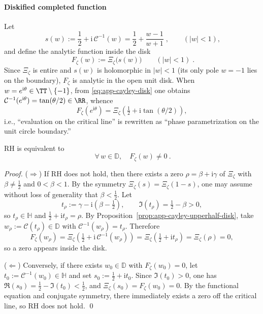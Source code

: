 \paragraph{Diskified completed function}
Let
\begin{equation}\label{eq:app-s-of-w}
\boxed{\;
s(w):=\frac12+\mathrm{i}\,\mathcal{C}^{-1}(w)
=\frac12+\frac{w-1}{w+1}\; },
\qquad (|w|<1),
\end{equation}
and define the analytic function inside the disk
\begin{equation}\label{eq:app-Fzeta-disk}
\boxed{\;
F_{\zeta}(w):=\Xi_{\zeta}\!\bigl(s(w)\bigr)\qquad(|w|<1)\; }.
\end{equation}
Since \(\Xi_{\zeta}\) is entire and \(s(w)\) is holomorphic in \(|w|<1\) (its only pole \(w=-1\) lies on the boundary), \(F_{\zeta}\) is analytic in the open unit disk.
When \(w=e^{\mathrm{i}\theta}\in\TT\setminus\{-1\}\), from \eqref{eq:app-cayley-disk} one obtains \(\mathcal{C}^{-1}(e^{\mathrm{i}\theta})=\tan(\theta/2)\in\RR\), whence
\begin{equation}\label{eq:app-Fzeta-boundary}
F_{\zeta}(e^{\mathrm{i}\theta})=\Xi_{\zeta}\!\left(\tfrac12+\mathrm{i}\tan(\theta/2)\right),
\end{equation}
i.e., ``evaluation on the critical line'' is rewritten as ``phase parametrization on the unit circle boundary.''

\begin{theorem}\label{thm:app-rh-iff-disk-zero-free}
RH is equivalent to
\[
\boxed{\ \forall\,w\in\mathbb{D},\quad F_{\zeta}(w)\neq 0\ }.
\]
\end{theorem}
\begin{proof}
(\(\Rightarrow\)) If RH does not hold, then there exists a zero \(\rho=\beta+\mathrm{i}\gamma\) of \(\Xi_{\zeta}\) with \(\beta\neq \tfrac12\) and \(0<\beta<1\).
By the symmetry \(\Xi_{\zeta}(s)=\Xi_{\zeta}(1-s)\), one may assume without loss of generality that \(\beta<\tfrac12\).
Let
\[
t_{\rho}:=\gamma-\mathrm{i}\left(\beta-\tfrac12\right),
\qquad
\Im(t_{\rho})=\tfrac12-\beta>0,
\]
so \(t_{\rho}\in\mathbb{H}\) and \( \tfrac12+\mathrm{i}t_{\rho}=\rho\).
By Proposition~\ref{prop:app-cayley-upperhalf-disk}, take \(w_{\rho}:=\mathcal{C}(t_{\rho})\in\mathbb{D}\) with \(\mathcal{C}^{-1}(w_{\rho})=t_{\rho}\).
Therefore
\[
F_{\zeta}(w_{\rho})
=\Xi_{\zeta}\!\left(\tfrac12+\mathrm{i}\,\mathcal{C}^{-1}(w_{\rho})\right)
=\Xi_{\zeta}\!\left(\tfrac12+\mathrm{i}t_{\rho}\right)
=\Xi_{\zeta}(\rho)
=0,
\]
so a zero appears inside the disk.

(\(\Leftarrow\)) Conversely, if there exists \(w_0\in\mathbb{D}\) with \(F_{\zeta}(w_0)=0\), let \(t_0:=\mathcal{C}^{-1}(w_0)\in\mathbb{H}\) and set \(s_0:=\tfrac12+\mathrm{i}t_0\).
Since \(\Im(t_0)>0\), one has \(\Re(s_0)=\tfrac12-\Im(t_0)<\tfrac12\), and
\(
\Xi_{\zeta}(s_0)=F_{\zeta}(w_0)=0
\).
By the functional equation and conjugate symmetry, there immediately exists a zero off the critical line, so RH does not hold. \qed
\end{proof}

